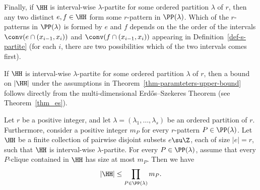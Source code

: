Finally, if $\HH$ is interval-wise $\lambda$-partite for some ordered partition $\lambda$ of $r$, then any two distinct $e,f\in\HH$ form some $r$-pattern in $\PP(\lambda)$. Which of the $r$-patterns in $\PP(\lambda)$ is formed by $e$ and $f$ depends on the the order of the intervals $\conv(e\cap (x_{i-1},x_i))$ and $\conv(f\cap (x_{i-1},x_i))$ appearing in Definition~\ref{def-s-partite} (for each $i$, there are two possibilities which of the two intervals comes first).

If $\HH$ is interval-wise $\lambda$-partite for some ordered partition $\lambda$ of $r$, then a bound on $|\HH|$ under the assumptions in Theorem~\ref{thm-paramteters-upper-bound} follows directly from the multi-dimensional Erd\H{o}s--Szekeres Theorem (see Theorem~\ref{thm_es}). 

\begin{lemma}\label{obs-interval-wise}
Let $r$ be a positive integer, and let $\lambda=(\lambda_1,\dots,\lambda_s)$ be an ordered partition of $r$. Furthermore, consider a positive integer $m_P$ for every $r$-pattern $P\in \PP(\lambda)$. Let $\HH$ be a finite collection of pairwise disjoint subsets $e\su \Z$, each of size $|e|=r$, such that $\HH$ is interval-wise $\lambda$-partite. For every $P\in \PP(\lambda)$, assume that every $P$-clique contained in $\HH$ has size at most $m_{P}$. Then we have
\[|\HH|\le \prod_{P\in \PP(\lambda)} m_{P}.\]
\end{lemma}


